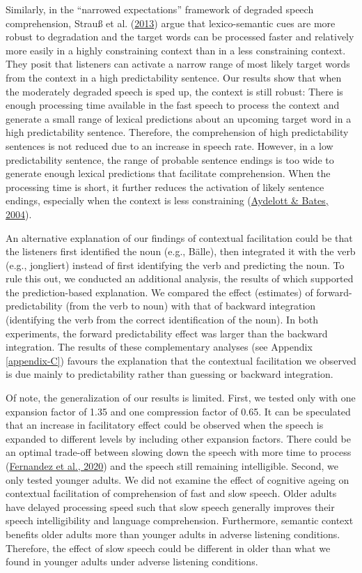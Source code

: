 \documentclass[a4paper, nobind]{templates/ociamthesis}
\begin{document}
Similarly, in the ``narrowed expectations'' framework of degraded speech comprehension, Strauß et al. (\protect\hyperlink{ref-Strauss2013}{2013}) argue that lexico-semantic cues are more robust to degradation and the target words can be processed faster and relatively more easily in a highly constraining context than in a less constraining context.
They posit that listeners can activate a narrow range of most likely target words from the context in a high predictability sentence.
Our results show that when the moderately degraded speech is sped up, the context is still robust:
There is enough processing time available in the fast speech to process the context and generate a small range of lexical predictions about an upcoming target word in a high predictability sentence.
Therefore, the comprehension of high predictability sentences is not reduced due to an increase in speech rate.
However, in a low predictability sentence, the range of probable sentence endings is too wide to generate enough lexical predictions that facilitate comprehension.
When the processing time is short, it further reduces the activation of likely sentence endings, especially when the context is less constraining (\protect\hyperlink{ref-Aydelott2004}{Aydelott \& Bates, 2004}).

An alternative explanation of our findings of contextual facilitation could be that the listeners first identified the noun (e.g., Bälle), then integrated it with the verb (e.g., jongliert) instead of first identifying the verb and predicting the noun.
To rule this out, we conducted an additional analysis, the results of which supported the prediction-based explanation.
We compared the effect (estimates) of forward-predictability (from the verb to noun) with that of backward integration (identifying the verb from the correct identification of the noun).
In both experiments, the forward predictability effect was larger than the backward integration.
The results of these complementary analyses (see Appendix \ref{appendix-C}) favours the explanation that the contextual facilitation we observed is due mainly to predictability rather than guessing or backward integration.

Of note, the generalization of our results is limited. First, we tested only with one expansion factor of 1.35 and one compression factor of 0.65.
It can be speculated that an increase in facilitatory effect could be observed when the speech is expanded to different levels by including other expansion factors.
There could be an optimal trade-off between slowing down the speech with more time to process (\protect\hyperlink{ref-Fernandez2020}{Fernandez et al., 2020}) and the speech still remaining intelligible.
Second, we only tested younger adults.
We did not examine the effect of cognitive ageing on contextual facilitation of comprehension of fast and slow speech.
Older adults have delayed processing speed such that slow speech generally improves their speech intelligibility and language comprehension.
Furthermore, semantic context benefits older adults more than younger adults in adverse listening conditions.
Therefore, the effect of slow speech could be different in older than what we found in younger adults under adverse listening conditions.
\end{document}
